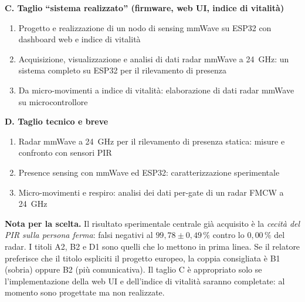 \begin{fullwidth}
\vspace{0.6em}
\noindent\textbf{C. Taglio ``sistema realizzato'' (firmware, web UI, indice di vitalit\`a)}
\begin{enumerate}[label=C\arabic*.,leftmargin=2.2em,itemsep=3pt]
  \item Progetto e realizzazione di un nodo di sensing mmWave su ESP32 con
        dashboard web e indice di vitalit\`a
  \item Acquisizione, visualizzazione e analisi di dati radar mmWave a 24~GHz: un
        sistema completo su ESP32 per il rilevamento di presenza
  \item Da micro-movimenti a indice di vitalit\`a: elaborazione di dati radar mmWave
        su microcontrollore
\end{enumerate}

\vspace{0.6em}
\noindent\textbf{D. Taglio tecnico e breve}
\begin{enumerate}[label=D\arabic*.,leftmargin=2.2em,itemsep=3pt]
  \item Radar mmWave a 24~GHz per il rilevamento di presenza statica: misure e
        confronto con sensori PIR
  \item Presence sensing con mmWave ed ESP32: caratterizzazione sperimentale
  \item Micro-movimenti e respiro: analisi dei dati per-gate di un radar FMCW a
        24~GHz
\end{enumerate}

\vspace{1.2em}
\noindent\textbf{Nota per la scelta.} Il risultato sperimentale centrale gi\`a
acquisito \`e la \emph{cecit\`a del PIR sulla persona ferma}: falsi negativi al
$99{,}78 \pm 0{,}49\,\%$ contro lo $0{,}00\,\%$ del radar. I titoli A2, B2 e D1 sono
quelli che lo mettono in prima linea. Se il relatore preferisce che il titolo
espliciti il progetto europeo, la coppia consigliata \`e B1 (sobria) oppure B2
(pi\`u comunicativa). Il taglio C \`e appropriato solo se l'implementazione della
web UI e dell'indice di vitalit\`a saranno completate: al momento sono progettate
ma non realizzate.
\end{fullwidth}

\cleardoublepage
